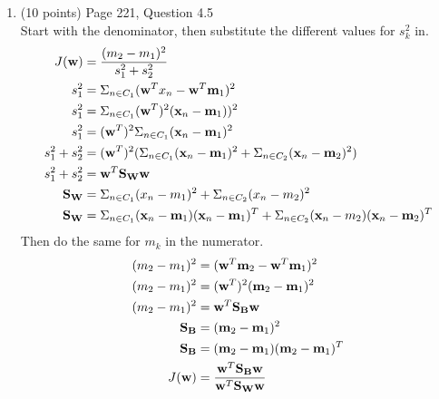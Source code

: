 \documentclass[11pt]{article}
\begin{document}
\begin{enumerate}
\item (10 points) Page 221, Question 4.5\\
Start with the denominator, then substitute the different values for $s_k^2$ in.
\begin{align*}
    J(\mathbf{w}) &= \frac{(m_2 - m_1)^2}{s_1^2 + s_2^2}\\
    s_1^2 &= \Sigma_{n \in C_1}(\mathbf{w}^Tx_n - \mathbf{w}^T\mathbf{m}_1)^2\\
    s_1^2 &= \Sigma_{n \in C_1}(\mathbf{w}^T)^2(\mathbf{x}_n - \mathbf{m}_1))^2\\
    s_1^2 &= (\mathbf{w}^T)^2 \Sigma_{n \in C_1}(\mathbf{x}_n - \mathbf{m}_1)^2\\
    s_1^2 + s_2^2 &= (\mathbf{w}^T)^2 (\Sigma_{n \in C_1}(\mathbf{x}_n - \mathbf{m}_1)^2 + \Sigma_{n \in C_2}(\mathbf{x}_n - \mathbf{m}_2)^2)\\
    s_1^2 + s_2^2 &= \mathbf{w}^T\mathbf{S}_{\mathbf{W}}\mathbf{w} \\
    \mathbf{S}_{\mathbf{W}} &= \Sigma_{n \in C_1}(x_n - m_1)^2 + \Sigma_{n \in C_2}(x_n - m_2)^2\\
    \mathbf{S}_{\mathbf{W}} &= \Sigma_{n \in C_1}(\mathbf{x}_n - \mathbf{m}_1)(\mathbf{x}_n - \mathbf{m}_1)^T + \Sigma_{n \in C_2}(\mathbf{x}_n - m_2)(\mathbf{x}_n - \mathbf{m}_2)^T\\
\end{align*}
Then do the same for $m_k$ in the numerator.\\
\begin{align*}
    (m_2 - m_1)^2 &= (\mathbf{w}^T\mathbf{m}_2 - \mathbf{w}^T\mathbf{m}_1)^2\\
    (m_2 - m_1)^2 &= (\mathbf{w}^T)^2(\mathbf{m}_2 - \mathbf{m}_1)^2\\
    (m_2 - m_1)^2 &= \mathbf{w}^T\mathbf{S}_{\mathbf{B}}\mathbf{w}\\
    \mathbf{S}_{\mathbf{B}} &= (\mathbf{m}_2 - \mathbf{m}_1)^2\\
    \mathbf{S}_{\mathbf{B}} &= (\mathbf{m}_2 - \mathbf{m}_1)(\mathbf{m}_2 - \mathbf{m}_1)^T\\
    J(\mathbf{w}) &= \frac{\mathbf{w}^T\mathbf{S}_{\mathbf{B}}\mathbf{w}}{\mathbf{w}^T\mathbf{S}_{\mathbf{W}}\mathbf{w}}\\
\end{align*}



\end{enumerate}
\end{document}
